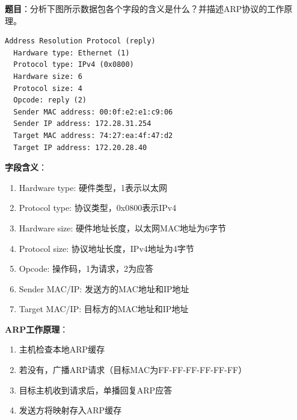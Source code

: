 \begin{examplebox}
\textbf{题目}：分析下图所示数据包各个字段的含义是什么？并描述ARP协议的工作原理。

\begin{lstlisting}[basicstyle=\ttfamily\footnotesize]
Address Resolution Protocol (reply)
  Hardware type: Ethernet (1)
  Protocol type: IPv4 (0x0800)
  Hardware size: 6
  Protocol size: 4
  Opcode: reply (2)
  Sender MAC address: 00:0f:e2:e1:c9:06
  Sender IP address: 172.28.31.254
  Target MAC address: 74:27:ea:4f:47:d2
  Target IP address: 172.20.28.40
\end{lstlisting}
\tcblower
\textbf{字段含义}：
\begin{enumerate}[itemsep=0pt]
    \item Hardware type: 硬件类型，1表示以太网
    \item Protocol type: 协议类型，0x0800表示IPv4
    \item Hardware size: 硬件地址长度，以太网MAC地址为6字节
    \item Protocol size: 协议地址长度，IPv4地址为4字节
    \item Opcode: 操作码，1为请求，2为应答
    \item Sender MAC/IP: 发送方的MAC地址和IP地址
    \item Target MAC/IP: 目标方的MAC地址和IP地址
\end{enumerate}

\textbf{ARP工作原理}：
\begin{enumerate}[itemsep=0pt]
    \item 主机检查本地ARP缓存
    \item 若没有，广播ARP请求（目标MAC为FF-FF-FF-FF-FF-FF）
    \item 目标主机收到请求后，单播回复ARP应答
    \item 发送方将映射存入ARP缓存
\end{enumerate}
\end{examplebox}

